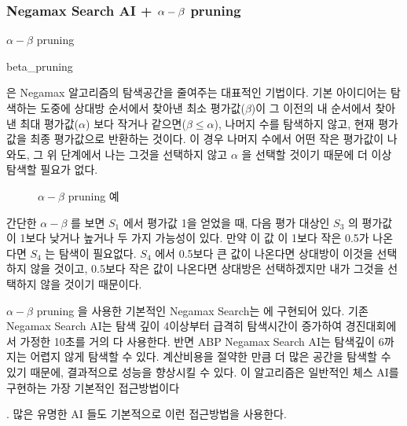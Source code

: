 \documentclass[letterpaper,10pt,english]{sphinxmanual}
\begin{document}
\subsubsection{Negamax Search AI + \protect\(\alpha-\beta\protect\) pruning}
\label{\detokenize{03-basic_ai_examples:negamax-search-ai-pruning}}
\(\alpha-\beta\) pruning %
\begin{footnote}[4]\sphinxAtStartFootnote
{}\textendash{}beta\_pruning
%
\end{footnote} 은 Negamax 알고리즘의 탐색공간을 줄여주는 대표적인 기법이다.
기본 아이디어는 탐색하는 도중에 상대방 순서에서 찾아낸 최소 평가값(\(\beta\))이 그 이전의 내 순서에서
찾아낸 최대 평가값(\(\alpha\)) 보다 작거나 같으면(\(\beta \le \alpha\)), 나머지 수를 탐색하지 않고,
현재 평가값을 최종 평가값으로 반환하는 것이다.
이 경우 나머지 수에서 어떤 작은 평가값이 나와도, 그 위 단계에서 나는 그것을 선택하지 않고 \(\alpha\) 을 선택할
것이기 때문에 더 이상 탐색할 필요가 없다.

\begin{figure}[htbp]
\centering
\capstart

\noindent{}
\caption{\(\alpha-\beta\) pruning 예}\label{\detokenize{03-basic_ai_examples:alpha-beta-pruning-example}}\label{\detokenize{03-basic_ai_examples:id35}}\end{figure}

간단한 \(\alpha-\beta\) {\hyperref[\detokenize{03-basic_ai_examples:alpha-beta-pruning-example}]{}} 를 보면 \(S_1\) 에서 평가값 1을 얻었을 때,
다음 평가 대상인 \(S_3\) 의 평가값이 1보다 낮거나 높거나 두 가지 가능성이 있다.
만약 이 값 이 1보다 작은 0.5가 나온다면 \(S_4\) 는 탐색이 필요없다. \(S_4\) 에서 0.5보다 큰 값이 나온다면
상대방이 이것을 선택하지 않을 것이고, 0.5보다 작은 값이 나온다면 상대방은 선택하겠지만 내가 그것을 선택하지 않을 것이기 때문이다.

\(\alpha-\beta\) pruning 을 사용한 기본적인 Negamax Search는 {\hyperref[\detokenize{agents.search:agents.search.abp_negamax_search_agent.ABPNegamaxSearchAgent}]{}} 에 구현되어 있다.
기존 Negamax Search AI는 탐색 깊이 4이상부터 급격히 탐색시간이 증가하여 경진대회에서 가정한 10초를 거의 다 사용한다.
반면 ABP Negamax Search AI는 탐색깊이 6까지는 어렵지 않게 탐색할 수 있다.
계산비용을 절약한 만큼 더 많은 공간을 탐색할 수 있기 때문에, 결과적으로 성능을 향상시킬 수 있다.
이 알고리즘은 일반적인 체스 AI를 구현하는 가장 기본적인 접근방법이다 %
\begin{footnote}[5]\sphinxAtStartFootnote
{}
%
\end{footnote}.
많은 유명한 AI 들도 기본적으로 이런 접근방법을 사용한다.
\end{document}
